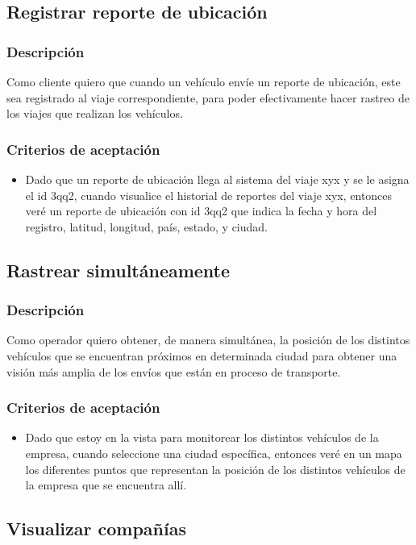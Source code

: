 \documentclass{article}
\begin{document}
\subsection{Registrar reporte de ubicación}
\subsubsection{Descripción} 
Como cliente quiero que cuando un vehículo envíe un reporte de ubicación, este sea registrado al viaje correspondiente, para poder efectivamente hacer rastreo de los viajes que realizan los vehículos.
\subsubsection{Criterios de aceptación}
\begin{itemize}
    \item Dado que un reporte de ubicación llega al sistema del viaje xyx y se le asigna el id 3qq2, cuando visualice el historial de reportes del viaje xyx, entonces veré un reporte de ubicación con id 3qq2 que indica la fecha y hora del registro, latitud, longitud, país, estado, y ciudad.
\end{itemize}

\subsection{Rastrear simultáneamente}
\subsubsection{Descripción} 
Como operador quiero obtener, de manera simultánea, la posición de los distintos vehículos que se encuentran próximos en determinada ciudad para obtener una visión más amplia de los envíos que están en proceso de transporte.
\subsubsection{Criterios de aceptación}
\begin{itemize}
    \item Dado que estoy en la vista para monitorear los distintos vehículos de la empresa, cuando seleccione una ciudad específica, entonces veré en un mapa los diferentes puntos que representan la posición de los distintos vehículos de la empresa que se encuentra allí.
\end{itemize}

\subsection{Visualizar compañías}
\end{document}
